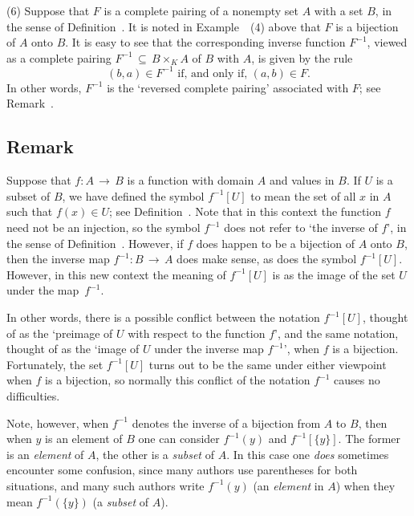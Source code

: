 {\V

        (6) Suppose that $F$ is a complete pairing of a nonempty set $A$ with a set $B$, in the sense of Definition~.
    It is noted in Example~~(4) above that $F$ is a bijection of $A$ onto $B$.
    It is easy to see that the corresponding inverse function $F^{-1}$, viewed as a complete pairing $F^{-1} \,{\subseteq}\, B{\times}_{K}A$ of $B$ with $A$, is given by the rule
        \begin{displaymath}
        (b,a){\in}F^{-1} \mbox{ if, and only if, } (a,b){\in}F.
        \end{displaymath}
    In other words, $F^{-1}$ is the `reversed complete pairing' associated with $F$; see Remark~.

\V

          \subsection{\small{{\bf Remark}}}
                  \label{RemrkA30.125}

\hspace*{\parindent}Suppose that $f:A \,{\rightarrow}\, B$ is a function with domain $A$ and values in $B$.
    If $U$ is a subset of $B$, we have defined the symbol $f^{-1}[U]$ to mean the set of all $x$ in $A$ such that $f(x){\in}U$;
    see Definition~.
    Note that in this context the function $f$ need not be an injection, so the symbol $f^{-1}$ does not refer to `the inverse of $f$', in the sense of Definition~.
    However, if $f$ does happen to be a bijection of $A$ onto $B$, then the inverse map $f^{-1}:B \,{\rightarrow}\, A$ does make sense, as does the symbol $f^{-1}[U]$.
    However, in this new context the meaning of $f^{-1}[U]$ is as the image of the set $U$ under the map~$f^{-1}$.

        In other words, there is a possible conflict between the notation $f^{-1}[U]$, thought of as the `preimage of $U$ with respect to the function $f$', 
    and the same notation, thought of as the `image of $U$ under the inverse map $f^{-1}$', when $f$ is a bijection.
    Fortunately, the set $f^{-1}[U]$ turns out to be the same under either viewpoint when $f$ is a bijection,
    so normally this conflict of the notation $f^{-1}$ causes no difficulties.

        Note, however, when $f^{-1}$ denotes the inverse of a bijection from $A$ to $B$,
    then when $y$ is an element of $B$ one can consider $f^{-1}(y)$ and $f^{-1}[\{y\}]$.
    The former is an {\em element} of $A$, the other is a {\em subset} of $A$. In this case one {\em does} sometimes encounter some confusion,
    since many authors use parentheses for both situations, and many such authors write $f^{-1}(y)$ (an {\em element} in $A$)
    when they mean $f^{-1}(\{y\})$ (a {\em subset} of $A$).


}
